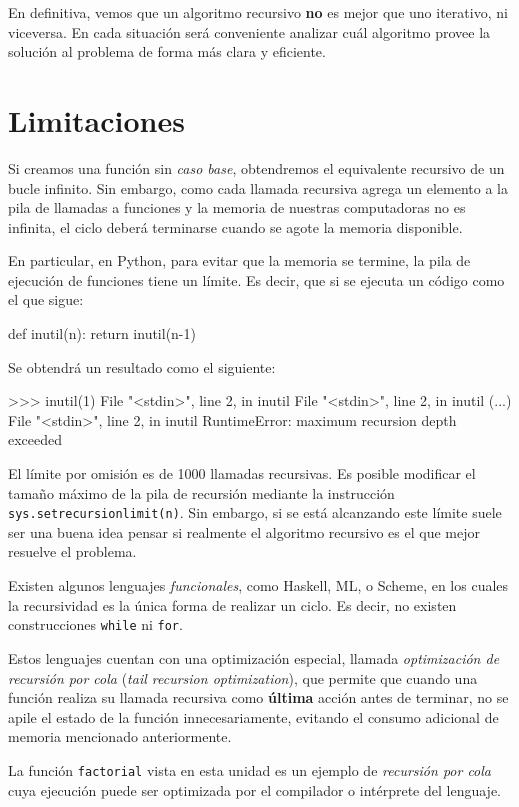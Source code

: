 \begin{atencion}
En definitiva, vemos que un algoritmo recursivo {\bf no} es mejor que uno
iterativo, ni viceversa.  En cada situación será conveniente analizar cuál
algoritmo provee la solución al problema de forma más clara y eficiente.
\end{atencion}

\section{Limitaciones}

Si creamos una función sin {\it caso base}, obtendremos el equivalente
recursivo de un bucle infinito.  Sin embargo, como cada llamada recursiva
agrega un elemento a la pila de llamadas a funciones y la memoria de
nuestras computadoras no es infinita, el ciclo deberá terminarse cuando se
agote la memoria disponible.

En particular, en Python, para evitar que la memoria se termine, la pila de
ejecución de funciones tiene un límite. Es decir, que si se ejecuta un
código como el que sigue:

\begin{codigo-python-sn}
def inutil(n):
    return inutil(n-1)
\end{codigo-python-sn}

Se obtendrá un resultado como el siguiente:

\begin{codigo-python-sn}
>>> inutil(1)
  File "<stdin>", line 2, in inutil
  File "<stdin>", line 2, in inutil
  (...)
  File "<stdin>", line 2, in inutil
RuntimeError: maximum recursion depth exceeded
\end{codigo-python-sn}

El límite por omisión es de 1000 llamadas recursivas. Es posible modificar
el tamaño máximo de la pila de recursión mediante la instrucción
\lstinline!sys.setrecursionlimit(n)!.  Sin embargo, si se está alcanzando
este límite suele ser una buena idea pensar si realmente el algoritmo
recursivo es el que mejor resuelve el problema.

\begin{sabias_que}
Existen algunos lenguajes {\it funcionales}, como Haskell, ML, o Scheme, en
los cuales la recursividad es la única forma de realizar un ciclo.  Es
decir, no existen construcciones {\tt while} ni {\tt for}.

Estos lenguajes cuentan con una optimización especial, llamada {\it
optimización de recursión por cola} ({\it tail recursion optimization}),
que permite que cuando una función realiza su llamada recursiva como {\bf
última} acción antes de terminar, no se apile el estado de la función
innecesariamente, evitando el consumo adicional de memoria mencionado
anteriormente.

La función \lstinline!factorial! vista en esta unidad es un ejemplo de {\it
recursión por cola} cuya ejecución puede ser optimizada por el compilador o
intérprete del lenguaje.
\end{sabias_que}

